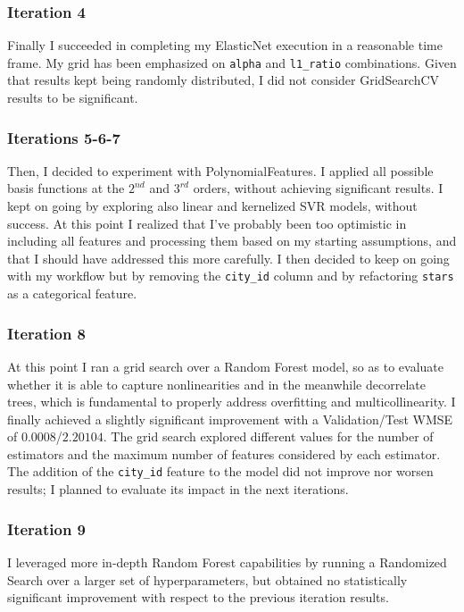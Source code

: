 \documentclass[preprint,12pt,3p]{elsarticle}
\begin{document}
\subsubsection{Iteration 4}
Finally I succeeded in completing my ElasticNet execution in a reasonable time frame. My grid has been emphasized on \verb|alpha| and \verb|l1_ratio| combinations. Given that results kept being randomly distributed, I did not consider GridSearchCV results to be significant.

\subsubsection{Iterations 5-6-7}
Then, I decided to experiment with PolynomialFeatures. I applied all possible basis functions at the $2^{nd}$ and $3^{rd}$ orders, without achieving significant results. I kept on going by exploring also linear and kernelized SVR models, without success. At this point I realized that I've probably been too optimistic in including all features and processing them based on my starting assumptions, and that I should have addressed this more carefully. I then decided to keep on going with my workflow but by removing the \verb|city_id| column and by refactoring \verb|stars| as a categorical feature.

\subsubsection{Iteration 8}
At this point I ran a grid search over a Random Forest model, so as to evaluate whether it is able to capture nonlinearities and in the meanwhile decorrelate trees, which is fundamental to properly address overfitting and multicollinearity. 
I finally achieved a slightly significant improvement with a Validation/Test WMSE of $0.0008$/$2.20104$. The grid search explored different values for the number of estimators and the maximum number of features considered by each estimator. The addition of the \verb|city_id| feature to the model did not improve nor worsen results; I planned to evaluate its impact in the next iterations. 

\subsubsection{Iteration 9}
I leveraged more in-depth Random Forest capabilities by running a Randomized Search over a larger set of hyperparameters, but obtained no statistically significant improvement with respect to the previous iteration results.
\end{document}
